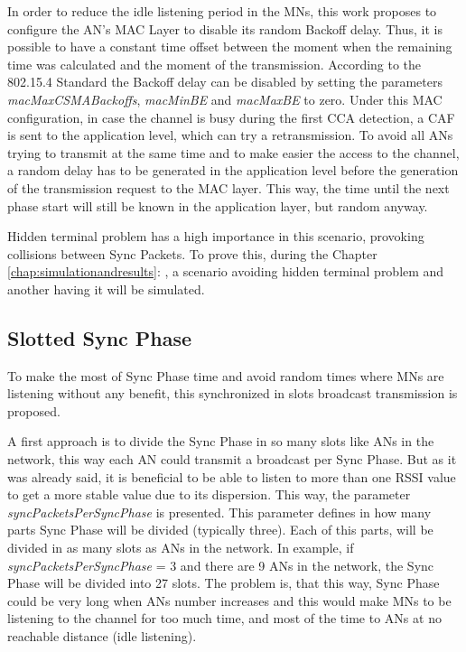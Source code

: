 In order to reduce the idle listening period in the \acp{MN}, this work proposes to configure the \ac{AN}'s \ac{MAC} Layer to disable its random 
Backoff delay. Thus, it is possible to have a constant time offset between the moment when the remaining time was calculated and the moment of the 
transmission. According to the 802.15.4 Standard the Backoff delay can be disabled by setting the parameters \textit{macMaxCSMABackoffs}, 
\textit{macMinBE} and \textit{macMaxBE} 
to zero. Under this \ac{MAC} configuration, in case the channel is busy during the first \ac{CCA} detection, a \ac{CAF} is sent to the application 
level, which can try a retransmission. To avoid all \acp{AN} trying to transmit at the same time and to make easier the access to the channel, a random 
delay has to be generated in the application level before the generation of the transmission request to the \ac{MAC} layer. This way, the time until
the next phase start will still be known in the application layer, but random anyway. 

Hidden terminal problem has a high importance in this scenario, provoking collisions between Sync Packets. To prove this, during the Chapter 
\ref{chap:simulationandresults}: , a scenario avoiding hidden terminal problem and another having it will be simulated.

\subsection{Slotted Sync Phase}
\label{subsec:slottedsyncphase}

To make the most of Sync Phase time and avoid random times where \acp{MN} are listening without any benefit, this synchronized in slots broadcast 
transmission is proposed.

A first approach is to divide the Sync Phase in so many slots like \acp{AN} in the network, this way each \ac{AN} could transmit a broadcast per Sync Phase.
But as it was already said, it is beneficial to be able to listen to more than one \ac{RSSI} value to get a more stable value due to its dispersion. This
way, the parameter \textit{syncPacketsPerSyncPhase} is presented. This parameter defines in how many parts Sync Phase will be divided (typically three). Each of 
this parts, will be divided in as many slots as \acp{AN} in the network. In example, if \textit{syncPacketsPerSyncPhase} = 3 and there are 9 \acp{AN} in the 
network, the Sync Phase will be divided into 27 slots. The problem is, that this way, Sync Phase could be very long when \acp{AN} number increases and this would make
\acp{MN} to be listening to the channel for too much time, and most of the time to \acp{AN} at no reachable distance (idle listening).

